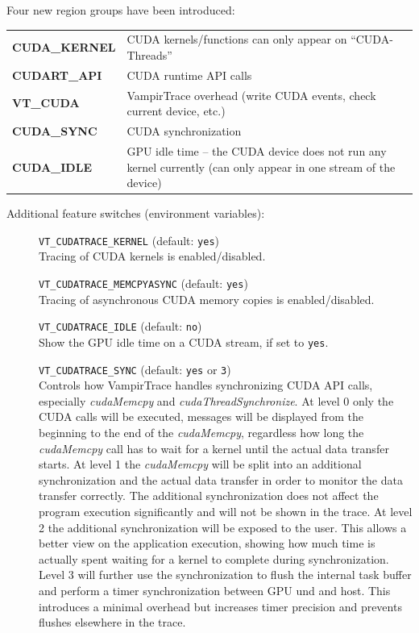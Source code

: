 \documentclass[a4paper,twoside,12pt,BCOR12mm]{scrbook}
\begin{document}
  \noindent Four new region groups have been introduced:
  \begin{center}
    \setlength{\tabcolsep}{9pt}
    \renewcommand{\arraystretch}{1.2}
    \begin{tabular}{lp{9.5cm}}
      \textbf{CUDA\_KERNEL} & CUDA kernels/functions can only appear on 
			      ``CUDA-Threads''\\
      \textbf{CUDART\_API}    & CUDA runtime API calls\\
      \textbf{VT\_CUDA}     & VampirTrace overhead (write CUDA events, 
			      check current device, etc.)\\
      \textbf{CUDA\_SYNC}   & CUDA synchronization\\
      \textbf{CUDA\_IDLE}   & GPU idle time -- the CUDA device does not run any 
			      kernel currently (can only appear in one stream of 
                              the device)
  \end{tabular}
  \end{center}

  \noindent Additional feature switches (environment variables):
  \begin{description}
    \item[]\texttt{VT\_CUDATRACE\_KERNEL} (default: \texttt{yes})\\
      Tracing of CUDA kernels is enabled/disabled.
    \item[]\texttt{VT\_CUDATRACE\_MEMCPYASYNC} (default: \texttt{yes})\\
      Tracing of asynchronous CUDA memory copies is enabled/disabled.
    \item[]\texttt{VT\_CUDATRACE\_IDLE} (default: \texttt{no})\\
      Show the GPU idle time on a CUDA stream, if set to \texttt{yes}.
    \item[]\texttt{VT\_CUDATRACE\_SYNC} (default: \texttt{yes} or \texttt{3})\\
      Controls how VampirTrace handles synchronizing CUDA API calls, especially 
      \textit{cudaMemcpy} and \textit{cudaThreadSynchronize}.
      At level 0 only the CUDA calls will be executed, messages will be 
      displayed from the beginning to the end of the \textit{cudaMemcpy}, regardless how 
      long the \textit{cudaMemcpy} call has to wait for a kernel until the actual 
      data transfer starts. 
      At level 1 the \textit{cudaMemcpy} will be split into an additional synchronization 
      and the actual data transfer in order to monitor the data transfer correctly. 
      The additional synchronization does not affect the program execution 
      significantly and will not be shown in the trace.
      At level 2 the additional synchronization will be exposed to the user. 
      This allows a better view on the application execution, showing how much 
      time is actually spent waiting for a kernel to complete during synchronization.
      Level 3 will further use the synchronization to flush the internal task 
      buffer and perform a timer synchronization between GPU und and host. This 
      introduces a minimal overhead but increases timer precision and prevents 
      flushes elsewhere in the trace.
 \end{description}
\end{document}
